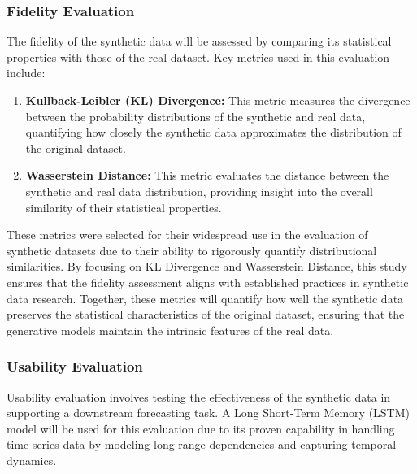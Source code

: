 \documentclass{article}
\begin{document}
\subsubsection{Fidelity Evaluation}
The fidelity of the synthetic data will be assessed by comparing its statistical properties with those of the real dataset. Key metrics used in this evaluation include:
\begin{enumerate}
    \item \textbf{Kullback-Leibler (KL) Divergence:} This metric measures the divergence between the probability distributions of the synthetic and real data, quantifying how closely the synthetic data approximates the distribution of the original dataset.
    \item \textbf{Wasserstein Distance:} This metric evaluates the distance between the synthetic and real data distribution, providing insight into the overall similarity of their statistical properties.
\end{enumerate}

These metrics were selected for their widespread use in the evaluation of synthetic datasets due to their ability to rigorously quantify distributional similarities. By focusing on KL Divergence and Wasserstein Distance, this study ensures that the fidelity assessment aligns with established practices in synthetic data research. Together, these metrics will quantify how well the synthetic data preserves the statistical characteristics of the original dataset, ensuring that the generative models maintain the intrinsic features of the real data.

\subsubsection{Usability Evaluation}
Usability evaluation involves testing the effectiveness of the synthetic data in supporting a downstream forecasting task. A Long Short-Term Memory (LSTM) model will be  used for this evaluation due to its proven capability in handling time series data by modeling long-range dependencies and capturing temporal dynamics.
\end{document}
